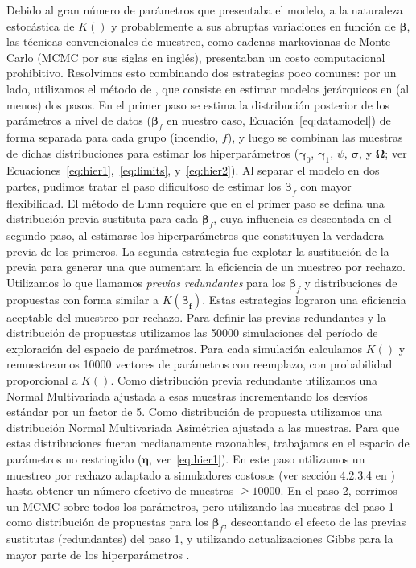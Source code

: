 Debido al gran número de parámetros que presentaba el modelo, a la naturaleza estocástica de $K()$ y probablemente a sus abruptas variaciones en función de $\boldsymbol{\beta}$, las técnicas convencionales de muestreo, como cadenas markovianas de Monte Carlo (MCMC por sus siglas en inglés), presentaban un costo computacional prohibitivo. Resolvimos esto combinando dos estrategias poco comunes: por un lado, utilizamos el método de \citet{lunn2013fully}, que consiste en estimar modelos jerárquicos en (al menos) dos pasos. En el primer paso se estima la distribución posterior de los parámetros a nivel de datos ($\boldsymbol{\beta}_f$ en nuestro caso, Ecuación~\ref{eq:datamodel}) de forma separada para cada grupo (incendio, $f$), y luego se combinan las muestras de dichas distribuciones para estimar los hiperparámetros ($\boldsymbol{\gamma}_0$, $\boldsymbol{\gamma}_1$, $\psi$, $\boldsymbol{\sigma}$, y $\boldsymbol{\Omega}$; ver Ecuaciones~\ref{eq:hier1},~\ref{eq:limits}, y~\ref{eq:hier2}). Al separar el modelo en dos partes, pudimos tratar el paso dificultoso de estimar los $\boldsymbol{\beta}_f$ con mayor flexibilidad. El método de Lunn requiere que en el primer paso se defina una distribución previa sustituta para cada $\boldsymbol{\beta}_f$, cuya influencia es descontada en el segundo paso, al estimarse los hiperparámetros que constituyen la verdadera previa de los primeros. La segunda estrategia fue explotar la sustitución de la previa para generar una que aumentara la eficiencia de un muestreo por rechazo. Utilizamos lo que llamamos \textit{previas redundantes} para los $\boldsymbol{\beta}_f$ y distribuciones de propuestas con forma similar a $K(\boldsymbol{\beta_f})$. Estas estrategias lograron una eficiencia aceptable del muestreo por rechazo. Para definir las previas redundantes y la distribución de propuestas utilizamos las 50000 simulaciones del período de exploración del espacio de parámetros. Para cada simulación calculamos $K()$ y remuestreamos 10000 vectores de parámetros con reemplazo, con probabilidad proporcional a $K()$. Como distribución previa redundante utilizamos una Normal Multivariada ajustada a esas muestras incrementando los desvíos estándar por un factor de 5. Como distribución de propuesta utilizamos una distribución Normal Multivariada Asimétrica ajustada a las muestras. Para que estas distribuciones fueran medianamente razonables, trabajamos en el espacio de parámetros no restringido ($\boldsymbol{\eta}$, ver~\ref{eq:hier1}). En este paso utilizamos un muestreo por rechazo adaptado a simuladores costosos (ver sección 4.2.3.4 en \citep{sisson2018handbook}) hasta obtener un número efectivo de muestras $\ge 10000$. En el paso 2, corrimos un MCMC sobre todos los parámetros, pero utilizando las muestras del paso 1 como distribución de propuestas para los $\boldsymbol{\beta}_f$, descontando el efecto de las previas sustitutas (redundantes) del paso 1, y utilizando actualizaciones Gibbs para la mayor parte de los hiperparámetros \citep{lunn2013fully}.

